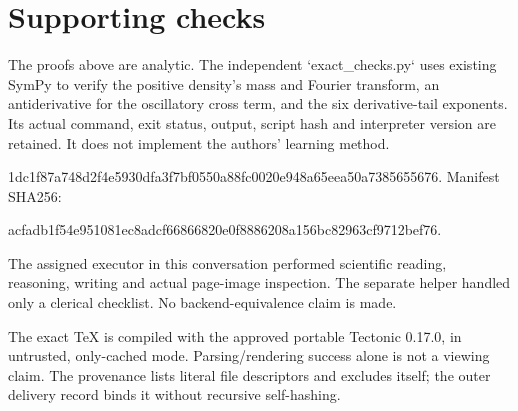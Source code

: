 \documentclass[10pt]{article}
\begin{document}
\section*{Supporting checks}
The proofs above are analytic. The independent `exact\_checks.py` uses existing SymPy to verify the positive density’s mass and Fourier transform, an antiderivative for the oscillatory cross term, and the six derivative-tail exponents. Its actual command, exit status, output, script hash and interpreter version are retained. It does not implement the authors’ learning method.\par
1dc1f87a748d2f4e5930dfa3f7bf0550a88fc0020e948a65eea50a7385655676. Manifest SHA256:\par
acfadb1f54e951081ec8adcf66866820e0f8886208a156bc82963cf9712bef76.\par
The assigned executor in this conversation performed scientific reading, reasoning, writing and actual page-image inspection. The separate helper handled only a clerical checklist. No backend-equivalence claim is made.\par
The exact TeX is compiled with the approved portable Tectonic 0.17.0, in untrusted, only-cached mode. Parsing/rendering success alone is not a viewing claim. The provenance lists literal file descriptors and excludes itself; the outer delivery record binds it without recursive self-hashing.\par
\end{document}
